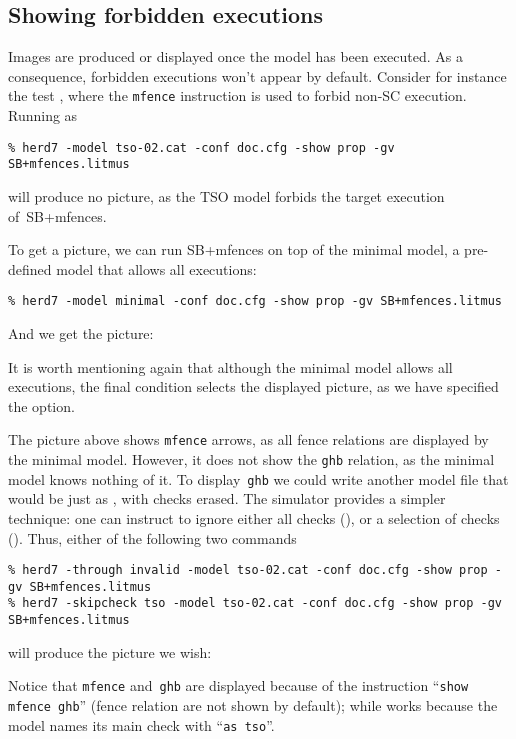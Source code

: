 \subsection{\label{show:forbidden}Showing forbidden executions}
Images are produced or displayed once the model has been executed.
As a consequence,
forbidden executions won't appear by default.
Consider for instance the test ,
where the \texttt{mfence} instruction is used to forbid
 non-SC execution. Running \herd{} as
\begin{verbatim}
% herd7 -model tso-02.cat -conf doc.cfg -show prop -gv SB+mfences.litmus
\end{verbatim}
will produce no picture, as the TSO model forbids the target execution
of~\textsf{SB+mfences}.

To get a picture, we can run \textsf{SB+mfences} on top of the minimal
model, a pre-defined model that allows all executions:
\begin{verbatim}
% herd7 -model minimal -conf doc.cfg -show prop -gv SB+mfences.litmus
\end{verbatim}
And we get the picture:
\begin{center}\end{center}
It is worth mentioning again  that although the minimal model allows all
executions, the final condition
selects the displayed picture, as we have specified the
 option.


\label{name:check}The picture above shows \verb+mfence+ arrows, as all
fence relations are displayed by the minimal model.
However, it  does not show the \verb+ghb+ relation, as the minimal
model knows nothing of it.
To display~\verb+ghb+ we could write another model file that would be just as
, with checks erased.
The simulator \herd{} provides a simpler technique:
one can instruct \herd{} to ignore
either all checks (), or a selection of checks
().
Thus, either of the following two commands
\begin{verbatim}
% herd7 -through invalid -model tso-02.cat -conf doc.cfg -show prop -gv SB+mfences.litmus
% herd7 -skipcheck tso -model tso-02.cat -conf doc.cfg -show prop -gv SB+mfences.litmus
\end{verbatim}
will produce the picture we wish:
\begin{center}\end{center}
Notice that \verb+mfence+ and~\verb+ghb+ are displayed because
of the instruction ``\verb+show mfence ghb+'' (fence relation are not shown
by default);
while  works because the  model
names its main check with ``\verb+as tso+''.

